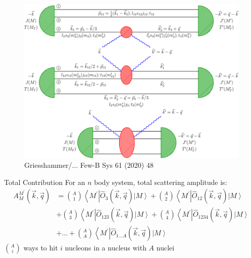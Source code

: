 \documentclass{beamer}
\newcommand{\bv}{\vec}
\begin{document}
\begin{frame}\frametitle{}
\begin{figure}[ht]
\begin{center}
\includegraphics[scale=0.50]{kinematics3He.pdf}
\caption{Griesshammer/... Few-B Sys 61 (2020) 48}
\end{center}
\end{figure}
\end{frame}

\begin{frame}{Total Contribution}
For an $n$ body system, total scattering amplitude is:
\begin{align*}
    A_{M}^{M^{\prime} }(\bv{k}, \bv{q})&=\binom{A}{1}\left\langle M^{\prime}\right|\hat{O}_{3}^{}(\bv{k}, \bv{q})\left|M\right \rangle + \binom{A}{2} \left\langle M^{\prime}\right|\hat{O}_{12}^{}(\bv{k}, \bv{q}) \left| M\right\rangle\\
        &+ \binom{A}{3}\left\langle M^{\prime}\right|\hat{O}_{123}^{}(\bv{k}, \bv{q})\left|M\right \rangle + \binom{A}{4} \left\langle M^{\prime}\right|\hat{O}_{1234}^{}(\bv{k}, \bv{q}) \left| M\right\rangle\\
        &+... + \binom{A}{A}\left\langle M^{\prime}\right|\hat{O}_{1...A}^{}(\bv{k}, \bv{q})\left|M\right \rangle
\end{align*}
$\binom{A}{i}$ ways to hit $i$ nucleons in a nucleus with $A$ nuclei
\end{frame}
\end{document}
